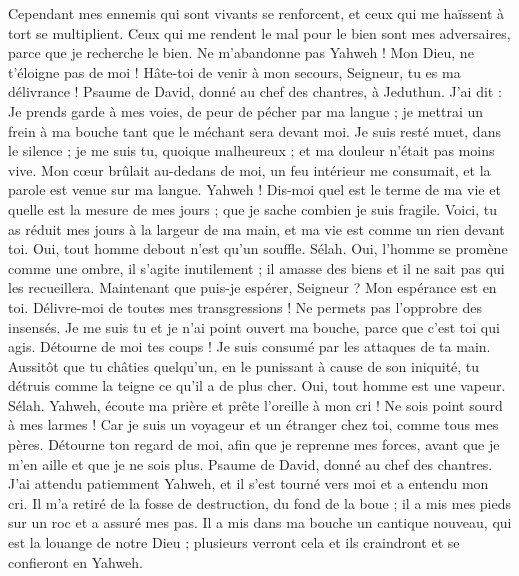 \begin{multicols}{2}
Cependant mes ennemis qui sont vivants se renforcent, et ceux qui me haïssent à tort se multiplient.
Ceux qui me rendent le mal pour le bien sont mes adversaires, parce que je recherche le bien.
Ne m'abandonne pas Yahweh ! Mon Dieu, ne t'éloigne pas de moi !
Hâte-toi de venir à mon secours, Seigneur, tu es ma délivrance !
\VerseOne{}Psaume de David, donné au chef des chantres, à Jeduthun.
J'ai dit : Je prends garde à mes voies, de peur de pécher par ma langue ; je mettrai un frein à ma bouche tant que le méchant sera devant moi.
Je suis resté muet, dans le silence ; je me suis tu, quoique malheureux ; et ma douleur n'était pas moins vive.
Mon cœur brûlait au-dedans de moi, un feu intérieur me consumait, et la parole est venue sur ma langue.
Yahweh ! Dis-moi quel est le terme de ma vie et quelle est la mesure de mes jours ; que je sache combien je suis fragile.
Voici, tu as réduit mes jours à la largeur de ma main, et ma vie est comme un rien devant toi. Oui, tout homme debout n'est qu'un souffle. Sélah.
Oui, l'homme se promène comme une ombre, il s'agite inutilement ; il amasse des biens et il ne sait pas qui les recueillera.
Maintenant que puis-je espérer, Seigneur ? Mon espérance est en toi.
Délivre-moi de toutes mes transgressions ! Ne permets pas l'opprobre des insensés.
Je me suis tu et je n'ai point ouvert ma bouche, parce que c'est toi qui agis.
Détourne de moi tes coups ! Je suis consumé par les attaques de ta main.
Aussitôt que tu châties quelqu'un, en le punissant à cause de son iniquité, tu détruis comme la teigne ce qu'il a de plus cher. Oui, tout homme est une vapeur. Sélah.
Yahweh, écoute ma prière et prête l'oreille à mon cri ! Ne sois point sourd à mes larmes ! Car je suis un voyageur et un étranger chez toi, comme tous mes pères.
Détourne ton regard de moi, afin que je reprenne mes forces, avant que je m'en aille et que je ne sois plus.
\VerseOne{}Psaume de David, donné au chef des chantres.
J'ai attendu patiemment Yahweh, et il s'est tourné vers moi et a entendu mon cri.
Il m'a retiré de la fosse de destruction, du fond de la boue ; il a mis mes pieds sur un roc et a assuré mes pas.
Il a mis dans ma bouche un cantique nouveau, qui est la louange de notre Dieu ; plusieurs verront cela et ils craindront et se confieront en Yahweh.

\end{multicols}
